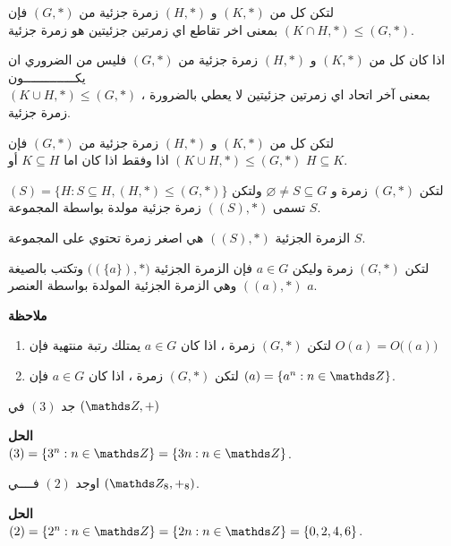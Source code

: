    \begin{theorem}
   	لتكن كل من $(K, *)$ و $(H, *)$ زمرة جزئية من $(G, *)$ فإن $(K \cap H, *) \leq (G, *)$ بمعنى اخر تقاطع اي زمرتين جزئيتين هو زمرة جزئية.
   \end{theorem}
   \begin{note}
   	اذا كان كل من $(K, *)$ و $(H, *)$ زمرة جزئية من $(G, *)$  فليس من الضروري ان يكــــــــــــــون \\
   	$(K \cup H, *) \leq (G, *)$  ، بمعنى آخر اتحاد اي زمرتين جزئيتين لا يعطي بالضرورة زمرة جزئية.
   \end{note}
   
   \begin{theorem}
   	 	لتكن كل من $(K, *)$ و $(H, *)$ زمرة جزئية من $(G, *)$ فإن $(K \cup H, *) \leq (G, *)$ اذا وفقط اذا كان اما $K\subseteq H$ أو $H\subseteq K$.
   \end{theorem}
   
   \begin{definition}
   	لتكن $(G, *)$ زمرة و $\varnothing\neq S\subseteq G$ ولتكن
   	$(S) = \{H : S\subseteq H , (H, *) \leq (G, *)\}$
   	تسمى $((S), *)$ زمرة جزئية مولدة بواسطة المجموعة $S$.
   \end{definition}
   
   \begin{note}
   	الزمرة الجزئية $((S), *)$ هي اصغر زمرة تحتوي على المجموعة $S$.
   \end{note}
   
\begin{definition}
	لتكن $(G, *)$ زمرة وليكن $a\in G$ فإن الزمرة الجزئية 	$\big((\{a\}) , *\big)$ وتكتب بالصيغة $((a), *) $ وهي الزمرة الجزئية المولدة بواسطة العنصر $a$.
\end{definition}

\noindent
\textbf{ملاحظة}
\begin{enumerate}
	\item لتكن $(G, *)$ زمرة ، اذا كان $a\in G$ يمتلك رتبة منتهية فإن $O(a) = O\Big((a)\Big)$
	\item  لتكن $(G, *)$ زمرة ، اذا كان $a\in G$ فإن $(a) = \{a^n : n\in \Z\}$.
\end{enumerate}

\begin{example}
	جد $(3)$ في $(\Z, +)$
\end{example}
   \noindent
   \textbf{الحل}\\
   \noindent
   $(3) = \{3^n : n\in \Z\} = \{3n : n\in \Z\}$.
   
   \begin{example}
   	اوجد $(2)$ فــــي $(\Z_8, +_8)$.
   \end{example}
   \noindent
   \textbf{الحل}\\
   \noindent
   $(2) = \{2^n : n\in \Z\} = \{2n : n\in \Z\} = \{0,2,4,6\}$.
   
